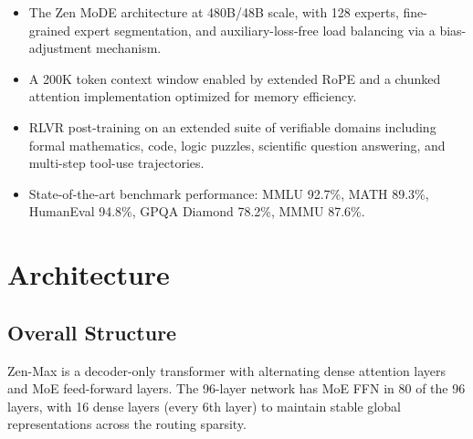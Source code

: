 \documentclass[11pt,a4paper]{article}
\begin{document}
\begin{itemize}
  \item The Zen MoDE architecture at 480B/48B scale, with 128 experts, fine-grained expert
        segmentation, and auxiliary-loss-free load balancing via a bias-adjustment mechanism.
  \item A 200K token context window enabled by extended RoPE and a chunked attention
        implementation optimized for memory efficiency.
  \item RLVR post-training on an extended suite of verifiable domains including formal
        mathematics, code, logic puzzles, scientific question answering, and multi-step
        tool-use trajectories.
  \item State-of-the-art benchmark performance: MMLU 92.7\%, MATH 89.3\%, HumanEval 94.8\%,
        GPQA Diamond 78.2\%, MMMU 87.6\%.
\end{itemize}

\section{Architecture}

\subsection{Overall Structure}

Zen-Max is a decoder-only transformer with alternating dense attention layers and MoE
feed-forward layers. The 96-layer network has MoE FFN in 80 of the 96 layers, with 16 dense
layers (every 6th layer) to maintain stable global representations across the routing sparsity.
\end{document}
